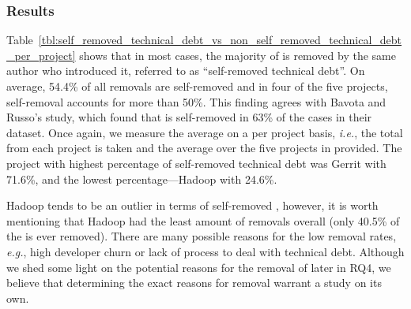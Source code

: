 \subsubsection*{Results} Table~\ref{tbl:self_removed_technical_debt_vs_non_self_removed_technical_debt_per_project} shows that in most cases, the majority of \SATD is removed by the same author who introduced it, referred to as ``self-removed technical debt''. On average, 54.4\% of all removals are self-removed and in four of the five projects, self-removal accounts for more than 50\%.  This finding agrees with Bavota and Russo's study, which found that \SATD is self-removed in 63\% of the cases in their dataset. Once again, we measure the average on a per project basis, \emph{i.e.}, the total from each project is taken and the average over the five projects in provided. The project with highest percentage of self-removed technical debt was Gerrit with 71.6\%, and the lowest percentage---Hadoop with 24.6\%. %

Hadoop tends to be an outlier in terms of self-removed \SATD, however, it is worth mentioning that Hadoop had the least amount of removals overall (only 40.5\% of the \SATD is ever removed). There are many possible reasons for the low removal rates, \emph{e.g.}, high developer churn or lack of process to deal with technical debt. Although we shed some light on the potential reasons for the removal of \SATD later in RQ4, we believe that determining the exact reasons for \SATD removal warrant a study on its own.







\subsection*{\rqiii}

